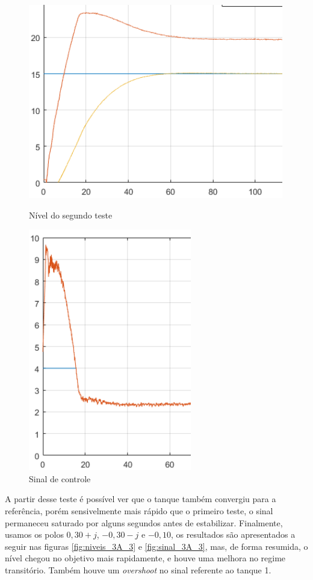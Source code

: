 \documentclass[
	12pt,				%
	openany,			%
	oneside,			%
	a4paper,			%
	english,			%
	french,				%
	spanish,			%
	brazil,				%
	]{abntex2}
\begin{document}
{\begin{figure}[h]
	\centering
	\begin{minipage}{.5\textwidth}
		\centering
		\includegraphics[scale=0.45]{imagens/3A_2_niveis.png}
		\caption{Nível do segundo teste}
		\label{fig:niveis_3A_2}		
	\end{minipage}%
	\begin{minipage}{.5\textwidth}
		\centering
		\includegraphics[scale=0.45]{imagens/3A_2_sinal_controle.png}
		\caption{Sinal de controle}
		\label{fig:sinal_3A_2}		
	\end{minipage}
\end{figure}

A partir desse teste é possível ver que o tanque também convergiu para a referência, porém sensivelmente mais rápido que o primeiro teste, o sinal permaneceu saturado por alguns segundos antes de estabilizar. Finalmente, usamos os polos $0,30+j$, $-0,30-j$ e $-0,10$, os resultados são apresentados a seguir nas figuras \ref{fig:niveis_3A_3} e \ref{fig:sinal_3A_3}, mas, de forma resumida, o nível chegou no objetivo mais rapidamente, e houve uma melhora no regime transitório. Também houve um \textit{overshoot} no sinal referente ao tanque 1. 

}
\end{document}
